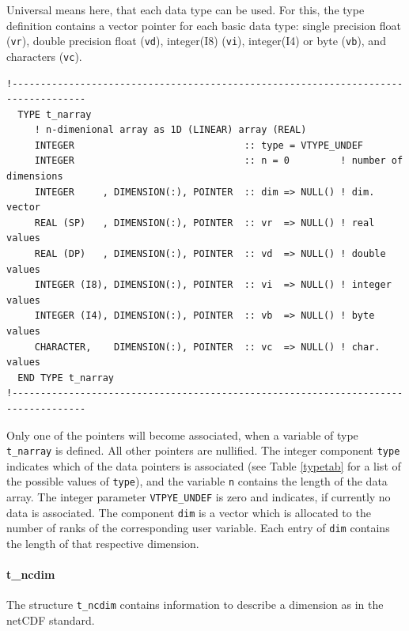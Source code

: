 \documentclass[11pt,twoside]{article}
\begin{document}
Universal means here, that each data type can be used.
For this, the type definition contains a vector pointer for each basic
data type: single
 precision float (\verb|vr|), double precision float (\verb|vd|),
 integer(I8) (\verb|vi|), integer(I4) or byte  (\verb|vb|),
and characters (\verb|vc|).
\begin{verbatim}
!-----------------------------------------------------------------------------------
  TYPE t_narray
     ! n-dimenional array as 1D (LINEAR) array (REAL)
     INTEGER                              :: type = VTYPE_UNDEF
     INTEGER                              :: n = 0         ! number of dimensions
     INTEGER     , DIMENSION(:), POINTER  :: dim => NULL() ! dim. vector
     REAL (SP)   , DIMENSION(:), POINTER  :: vr  => NULL() ! real values
     REAL (DP)   , DIMENSION(:), POINTER  :: vd  => NULL() ! double values
     INTEGER (I8), DIMENSION(:), POINTER  :: vi  => NULL() ! integer values
     INTEGER (I4), DIMENSION(:), POINTER  :: vb  => NULL() ! byte values
     CHARACTER,    DIMENSION(:), POINTER  :: vc  => NULL() ! char. values
  END TYPE t_narray
!-----------------------------------------------------------------------------------
\end{verbatim}
Only one of the pointers will become associated, when a variable of type 
\verb|t_narray| is defined. All other pointers are nullified. 
The integer component \verb|type| indicates which of the data pointers is 
associated (see Table \ref{typetab} for a
list of the possible values of \verb|type|),
and the variable \verb|n| contains the length of the data array.
The integer parameter \verb|VTPYE_UNDEF| is zero and indicates, if
currently no data is associated.
The component \verb|dim| is a vector which is allocated to the number
of ranks of the corresponding user variable. Each entry
of \verb|dim| contains the length of that respective dimension.


\paragraph{{t\_ncdim}\label{Tncdim}\\}
The structure \verb|t_ncdim| contains information to describe
 a dimension as in the netCDF standard.
\end{document}
